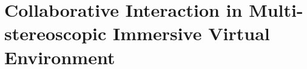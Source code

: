 \chapter{Collaborative Interaction in Multi-stereoscopic Immersive Virtual Environment}
\label{chapter:context}
